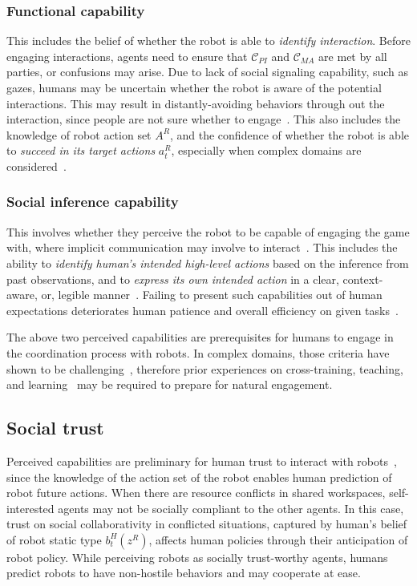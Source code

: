 \documentclass[letterpaper, 10 pt, conference]{ieeeconf}  %
\begin{document}
\subsubsection{Functional capability}
This includes the belief of whether the robot is able to \textit{identify 
interaction}. Before engaging interactions, agents need to ensure that 
$\mathcal{C}_{PI}$ and $\mathcal{C}_{MA}$ are met by all parties, or 
confusions may arise. Due to lack of social signaling capability, such as gazes, 
humans may be uncertain whether the robot is aware of the potential 
interactions. This may result in distantly-avoiding behaviors through out the interaction, since 
people are not sure whether to engage~\cite{dragan2015effects}.
This also includes the knowledge of robot action set $A^R$, and the confidence of 
whether the robot is able to \textit{succeed in its target actions} $a^R_t$, 
especially when complex domains are considered~\cite{chen2018planning}. 

\subsubsection{Social inference capability}
This involves whether they perceive the robot to be capable of engaging the 
game with, where implicit communication may involve to 
interact~\cite{knepper2017implicit}. This includes the ability to
\textit{identify human's intended high-level actions} based on the inference from 
past observations, and to \textit{express its own intended action} in a clear, 
context-aware, or, legible manner~\cite{dragan2013legibility}. Failing to 
present such capabilities out of human expectations deteriorates human patience 
and overall efficiency on given tasks~\cite{cha2015perceived}. 

The above two perceived capabilities are prerequisites for humans to engage in the 
coordination process with robots. In complex domains, those criteria have shown to be 
challenging~\cite{knepper2017implicit}, therefore prior experiences on 
cross-training, teaching, and learning~\cite{zhang2017plan} may be required 
to prepare for natural engagement. 
\vspace{-.2em}
\subsection{Social trust}%
\vspace{-.2em}
Perceived capabilities are preliminary for human trust to interact with 
robots~\cite{yang2017evaluating}, since the knowledge of the action set of the robot enables 
human prediction of robot future actions.
When there are resource conflicts in shared workspaces, 
self-interested agents may not be socially compliant to the other agents. 
In this case, trust on social collaborativity in conflicted situations, 
captured by human's belief of robot static type $b^H_t(z^R)$, 
affects human policies through their anticipation of robot policy. While 
perceiving robots as socially 
trust-worthy agents, humans predict robots to have non-hostile behaviors and 
may cooperate at ease.   
\end{document}
